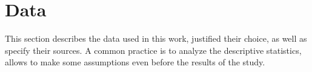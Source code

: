 \section{Data}
\label{sec:Data}

This section describes the data used in this work, justified their choice, as well as specify their sources. A common practice is to analyze the descriptive statistics, allows to make some assumptions even before the results of the study.